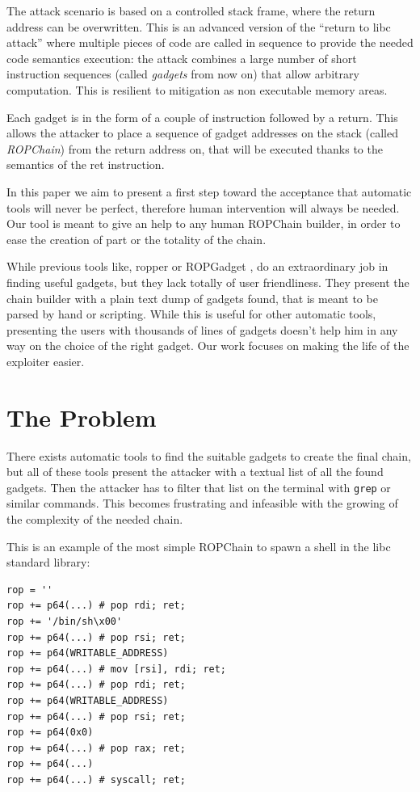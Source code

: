 \documentclass[twocolumn, 11pt]{article}
\begin{document}
The attack scenario is based on a controlled stack frame, where the return address can be overwritten. This is an advanced version of the ``return to libc attack'' \cite{libc} where multiple pieces of code are called in sequence to provide the needed code semantics execution: the attack combines a large number of short instruction sequences (called \textit{gadgets} from now on) that allow arbitrary computation. This is resilient to mitigation as non executable memory areas.

Each gadget is in the form of a couple of instruction followed by a return. This allows the attacker to place a sequence of gadget addresses on the stack (called \textit{ROPChain}) from the return address on, that will be executed thanks to the semantics of the ret instruction.

In this paper we aim to present a first step toward the acceptance that automatic tools will never be perfect, therefore human intervention will always be needed. Our tool is meant to give an help to any human ROPChain builder, in order to ease the creation of part or the totality of the chain.

While previous tools like, ropper \cite{ropper} or ROPGadget \cite{ROPGadget}, do an extraordinary job in finding useful gadgets, but they lack totally of user friendliness. They present the chain builder with a plain text dump of gadgets found, that is meant to be parsed by hand or scripting. While this is useful for other automatic tools, presenting the users with thousands of lines of gadgets doesn't help him in any way on the choice of the right gadget. Our work focuses on making the life of the exploiter easier.

\section{The Problem}
There exists automatic tools to find the suitable gadgets to create the final chain, but all of these tools present the attacker with a textual list of all the found gadgets. Then the attacker has to filter that list on the terminal with \texttt{grep} or similar commands. This becomes frustrating and infeasible with the growing of the complexity of the needed chain.

This is an example of the most simple ROPChain to spawn a shell in the libc standard library:

\begin{lstlisting}
rop = ''
rop += p64(...) # pop rdi; ret;
rop += '/bin/sh\x00'
rop += p64(...) # pop rsi; ret;
rop += p64(WRITABLE_ADDRESS)
rop += p64(...) # mov [rsi], rdi; ret;
rop += p64(...) # pop rdi; ret;
rop += p64(WRITABLE_ADDRESS)
rop += p64(...) # pop rsi; ret;
rop += p64(0x0)
rop += p64(...) # pop rax; ret;
rop += p64(...)
rop += p64(...) # syscall; ret;
\end{lstlisting}
\end{document}
